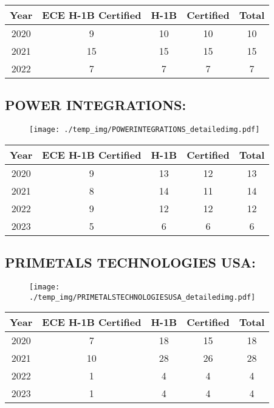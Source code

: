\documentclass{article}%
\begin{document}
%
\begin{longtable}{c|c|c|c|c}%
\hline%
Year&ECE H{-}1B Certified&H{-}1B&Certified&Total\\%
\hline%
2020&9&10&10&10\\%
\hline%
2021&15&15&15&15\\%
\hline%
2022&7&7&7&7\\%
\hline%
\end{longtable}

%
\newpage%
\subsection{POWER INTEGRATIONS:}%
\label{subsec:POWERINTEGRATIONS}%
\label{POWERINTEGRATIONSdetailed}%


\begin{figure}[htbp]%
\centering%
\texttt{[image: ./temp\_img/POWERINTEGRATIONS\_detailedimg.pdf]}%
\end{figure}

%
\begin{longtable}{c|c|c|c|c}%
\hline%
Year&ECE H{-}1B Certified&H{-}1B&Certified&Total\\%
\hline%
2020&9&13&12&13\\%
\hline%
2021&8&14&11&14\\%
\hline%
2022&9&12&12&12\\%
\hline%
2023&5&6&6&6\\%
\hline%
\end{longtable}

%
\newpage%
\subsection{PRIMETALS TECHNOLOGIES USA:}%
\label{subsec:PRIMETALSTECHNOLOGIESUSA}%
\label{PRIMETALSTECHNOLOGIESUSAdetailed}%


\begin{figure}[htbp]%
\centering%
\texttt{[image: ./temp\_img/PRIMETALSTECHNOLOGIESUSA\_detailedimg.pdf]}%
\end{figure}

%
\begin{longtable}{c|c|c|c|c}%
\hline%
Year&ECE H{-}1B Certified&H{-}1B&Certified&Total\\%
\hline%
2020&7&18&15&18\\%
\hline%
2021&10&28&26&28\\%
\hline%
2022&1&4&4&4\\%
\hline%
2023&1&4&4&4\\%
\hline%
\end{longtable}
\end{document}
